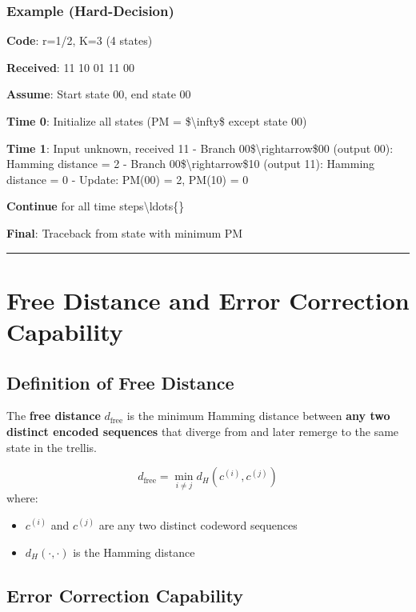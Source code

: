 \subsubsection{Example (Hard-Decision)}\label{example-hard-decision}

\textbf{Code}: r=1/2, K=3 (4 states)

\textbf{Received}: 11 10 01 11 00

\textbf{Assume}: Start state 00, end state 00

\textbf{Time 0}: Initialize all states (PM = \$\textbackslash infty\$
except state 00)

\textbf{Time 1}: Input unknown, received 11 - Branch
00\$\textbackslash rightarrow\$00 (output 00): Hamming distance = 2 -
Branch 00\$\textbackslash rightarrow\$10 (output 11): Hamming distance =
0 - Update: PM(00) = 2, PM(10) = 0

\textbf{Continue} for all time steps\textbackslash ldots\{\}

\textbf{Final}: Traceback from state with minimum PM

\begin{center}\rule{0.5\linewidth}{0.5pt}\end{center}

\section{Free Distance and Error Correction Capability}

\subsection{Definition of Free Distance}

The \textbf{free distance} $d_{\text{free}}$ is the minimum Hamming distance between \textbf{any two distinct encoded sequences} that diverge from and later remerge to the same state in the trellis.

\begin{equation}
d_{\text{free}} = \min_{i \neq j} d_H(c^{(i)}, c^{(j)})
\label{eq:free-distance}
\end{equation}
where:
\begin{itemize}
\item $c^{(i)}$ and $c^{(j)}$ are any two distinct codeword sequences
\item $d_H(\cdot, \cdot)$ is the Hamming distance
\end{itemize}

\subsection{Error Correction Capability}

